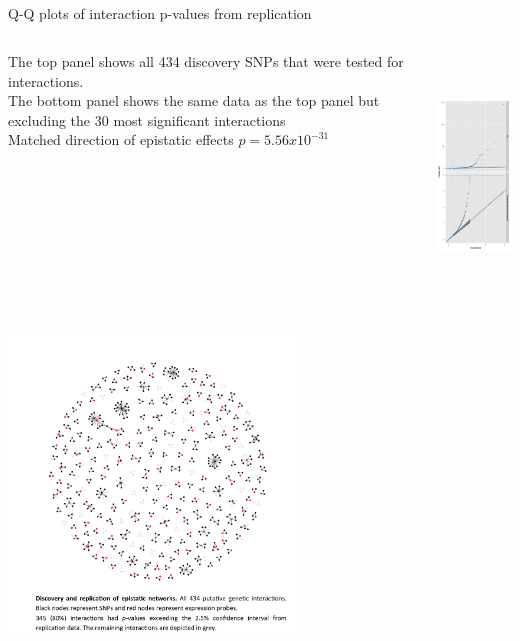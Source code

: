 \documentclass{beamer}
\begin{document}
\subsection{}
\begin{frame}{Q-Q plots of interaction p-values from replication}
\begin{columns}[c]
The top panel shows all 434 discovery SNPs that were tested for interactions. \\
\vspace{0.3cm}
The bottom panel shows the same data as the top panel but excluding the 30 most significant interactions \\
\vspace{0.3cm}
Matched direction of epistatic effects $p=5.56x10^{-31}$ 
\begin{center}
\includegraphics[height=6.5cm]{images/qqMeta.pdf} \\
\end{center}
\end{columns}
\end{frame}

\begin{frame}
\begin{center}
\includegraphics[height=8cm]{images/fireworks2.png} \\
\end{center}
\end{frame}
\end{document}

